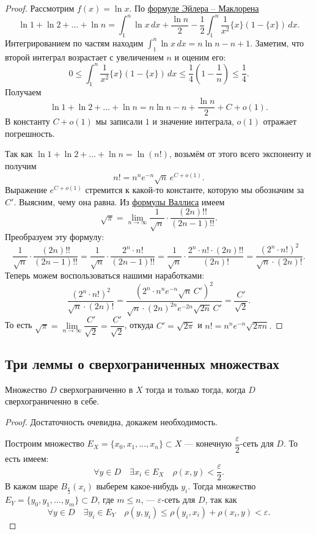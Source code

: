 \begin{proof}
	Рассмотрим \(f(x) = \ln x\). По \hyperlink{eumak}{формуле Эйлера -- Маклорена} \[
	\ln 1 + \ln 2 + \ldots + \ln n = \int_1^n \ln x \, dx + \frac{\ln n}{2} - \frac{1}{2} \int_1^n \frac{1}{x^2} \{x\} (1 - \{x\}) \, dx.
	\]
	Интегрированием по частям находим \(\displaystyle\int_1^n \ln x \, dx = n \ln n - n + 1\). Заметим, что второй интеграл возрастает с увеличением \(n\) и оценим его: \[
	0 \leqslant \int_1^n \frac{1}{x^2} \{x\} (1 - \{x\}) \, dx \leqslant \frac{1}{4} \left(1 - \frac{1}{n} \right) \leqslant \frac{1}{4}.
	\]
	Получаем \[
	\ln 1 + \ln 2 + \ldots + \ln n = n \ln n - n + \frac{\ln n}{2} + C + o(1).
	\]
	В константу \(C + o(1)\) мы записали \(1\) и значение интеграла, \(o(1)\) отражает погрешность.
	
	Так как \(\ln 1 + \ln 2 + \ldots + \ln n = \ln(n!)\), возьмём от этого всего экспоненту и получим \[
	n! = n^n e^{-n} \sqrt{n} \, e^{C + o(1)}.
	\]
	Выражение \(e^{C + o(1)}\) стремится к какой-то константе, которую мы обозначим за \(C'\). Выясним, чему она равна. Из \hyperlink{wall}{формулы Валлиса} имеем \[
	\sqrt{\pi} = \lim_{n \to \infty} \frac{1}{\sqrt{n}} \cdot \frac{(2n)!!}{(2n - 1)!!}.
	\]
	Преобразуем эту формулу: \[
	\frac{1}{\sqrt{n}} \cdot \frac{(2n)!!}{(2n - 1)!!} = \frac{1}{\sqrt{n}} \cdot \frac{2^n \cdot n!}{(2n - 1)!!} = \frac{1}{\sqrt{n}} \cdot \frac{2^n \cdot n! \cdot (2n)!!}{(2n)!} = \frac{(2^n \cdot n!)^2}{\sqrt{n} \cdot (2n)!}.
	\]
	Теперь можем воспользоваться нашими наработками: \[
	\frac{(2^n \cdot n!)^2}{\sqrt{n} \cdot (2n)!} = \frac{(2^n \cdot n^n e^{-n} \sqrt{n} \, C')^2}{\sqrt{n} \cdot (2n)^{2n} e^{-2n} \sqrt{2n} \, C'} = \frac{C'}{\sqrt{2}}.
	\]
	То есть \(\sqrt{\pi} = \lim\limits_{n \to \infty} \dfrac{C'}{\sqrt{2}} = \dfrac{C'}{\sqrt{2}}\), откуда \(C' = \sqrt{2\pi}\) и \(n! = n^n e^{-n} \sqrt{2\pi n}.\) 
	
\end{proof}

\subsection{Три леммы о сверхограниченных множествах}

\begin{lemma}
	Множество \(D\) сверхограниченно в \(X\) тогда и только тогда, когда \(D\) сверхограниченно в себе.
\end{lemma}

\begin{proof}
	Достаточность очевидна, докажем необходимость.
	
	Построим множество \(E_X = \{x_0, x_1,\ldots, x_n\} \subset X\) --- конечную \(\dfrac{\varepsilon}{2}\)-сеть для \(D\). То есть имеем: \[
	\forall y \in D \quad \exists x_i \in E_X \quad \rho(x, y) < \frac{\varepsilon}{2}.
	\]
	В кажом шаре \(B_{\frac{\varepsilon}{2}} (x_i)\) выберем какое-нибудь \(y_i\). Тогда множество \linebreak \(E_Y = \{y_0, y_1,\ldots, y_m\} \subset D\), где \(m \leqslant n\), --- \(\varepsilon\)-сеть для \(D\), так как \[
	\forall y \in D \quad \exists y_i \in E_Y \quad \rho(y, y_i) \leqslant \rho(y_i, x_i) + \rho(x_i, y) < \varepsilon.
	\]
\end{proof}

